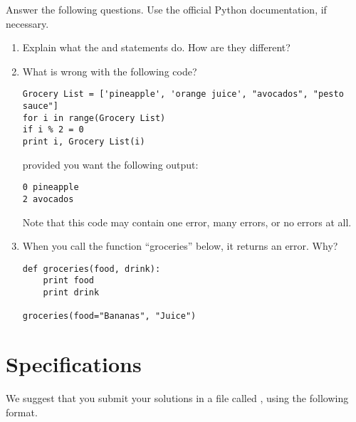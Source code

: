 \begin{problem}
Answer the following questions. Use the official Python documentation, if necessary.

\begin{enumerate}
\item Explain what the  and  statements do. How are they different?
\item What is wrong with the following code?
\begin{lstlisting}
Grocery List = ['pineapple', 'orange juice', "avocados", "pesto sauce"]
for i in range(Grocery List)
if i % 2 = 0
print i, Grocery List(i)
\end{lstlisting}
provided you want the following output:
\begin{lstlisting}
0 pineapple
2 avocados
\end{lstlisting}
Note that this code may contain one error, many errors, or no errors at all.
\item When you call the function ``groceries'' below, it returns an error. Why?
\begin{lstlisting}
def groceries(food, drink):
    print food
    print drink    

groceries(food="Bananas", "Juice")
\end{lstlisting}
\end{enumerate}
\end{problem}



\section*{Specifications}
We suggest that you submit your solutions in a file called , using the following format.

